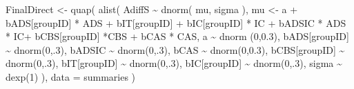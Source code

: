 \documentclass[
  10pt,
  dvipsnames,enabledeprecatedfontcommands]{scrartcl}
\newenvironment{Shaded}{\begin{snugshade}}{\end{snugshade}}
\newcommand{\AttributeTok}[1]{\textcolor[rgb]{0.77,0.63,0.00}{#1}}
\newcommand{\DecValTok}[1]{\textcolor[rgb]{0.00,0.00,0.81}{#1}}
\newcommand{\FloatTok}[1]{\textcolor[rgb]{0.00,0.00,0.81}{#1}}
\newcommand{\FunctionTok}[1]{\textcolor[rgb]{0.00,0.00,0.00}{#1}}
\newcommand{\NormalTok}[1]{#1}
\newcommand{\OtherTok}[1]{\textcolor[rgb]{0.56,0.35,0.01}{#1}}
\newcommand{\SpecialCharTok}[1]{\textcolor[rgb]{0.00,0.00,0.00}{#1}}
\begin{document}
\begin{Shaded}
\begin{Highlighting}[]
\NormalTok{FinalDirect }\OtherTok{\textless{}{-}} \FunctionTok{quap}\NormalTok{(}
  \FunctionTok{alist}\NormalTok{(}
\NormalTok{    AdiffS }\SpecialCharTok{\textasciitilde{}} \FunctionTok{dnorm}\NormalTok{( mu, sigma ),}
\NormalTok{    mu }\OtherTok{\textless{}{-}}\NormalTok{ a }\SpecialCharTok{+}\NormalTok{ bADS[groupID] }\SpecialCharTok{*}\NormalTok{ ADS }\SpecialCharTok{+}\NormalTok{  bIT[groupID] }\SpecialCharTok{+}\NormalTok{ bIC[groupID] }\SpecialCharTok{*}\NormalTok{ IC }\SpecialCharTok{+} 
\NormalTok{      bADSIC }\SpecialCharTok{*}\NormalTok{ ADS }\SpecialCharTok{*}\NormalTok{ IC}\SpecialCharTok{+}\NormalTok{ bCBS[groupID] }\SpecialCharTok{*}\NormalTok{CBS }\SpecialCharTok{+}\NormalTok{ bCAS }\SpecialCharTok{*}\NormalTok{ CAS,}
\NormalTok{    a }\SpecialCharTok{\textasciitilde{}} \FunctionTok{dnorm}\NormalTok{ (}\DecValTok{0}\NormalTok{,}\FloatTok{0.3}\NormalTok{),}
\NormalTok{    bADS[groupID] }\SpecialCharTok{\textasciitilde{}} \FunctionTok{dnorm}\NormalTok{(}\DecValTok{0}\NormalTok{,.}\DecValTok{3}\NormalTok{),}
\NormalTok{    bADSIC }\SpecialCharTok{\textasciitilde{}} \FunctionTok{dnorm}\NormalTok{(}\DecValTok{0}\NormalTok{,.}\DecValTok{3}\NormalTok{),}
\NormalTok{    bCAS }\SpecialCharTok{\textasciitilde{}} \FunctionTok{dnorm}\NormalTok{(}\DecValTok{0}\NormalTok{,}\FloatTok{0.3}\NormalTok{),}
\NormalTok{    bCBS[groupID] }\SpecialCharTok{\textasciitilde{}} \FunctionTok{dnorm}\NormalTok{(}\DecValTok{0}\NormalTok{,.}\DecValTok{3}\NormalTok{),}
\NormalTok{    bIT[groupID] }\SpecialCharTok{\textasciitilde{}} \FunctionTok{dnorm}\NormalTok{(}\DecValTok{0}\NormalTok{,.}\DecValTok{3}\NormalTok{),}
\NormalTok{    bIC[groupID] }\SpecialCharTok{\textasciitilde{}} \FunctionTok{dnorm}\NormalTok{(}\DecValTok{0}\NormalTok{,.}\DecValTok{3}\NormalTok{),}
\NormalTok{    sigma  }\SpecialCharTok{\textasciitilde{}} \FunctionTok{dexp}\NormalTok{(}\DecValTok{1}\NormalTok{)}
\NormalTok{  ), }
  \AttributeTok{data =}\NormalTok{ summaries}
\NormalTok{)}




\end{Highlighting}
\end{Shaded}
\end{document}
